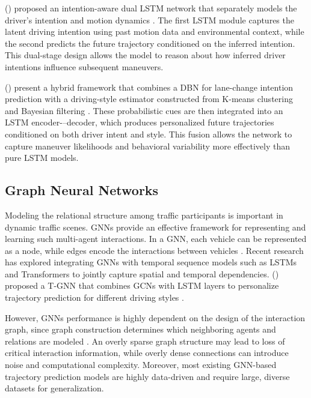 \par \citeauthor{xin2019intentionawarelonghorizontrajectory} (\citeyear{xin2019intentionawarelonghorizontrajectory}) proposed an intention-aware dual \ac{LSTM} network that separately models the
driver's intention and motion dynamics \cite{xin2019intentionawarelonghorizontrajectory}. The first \ac{LSTM} module captures the latent driving intention using
past motion data and environmental context, while the second predicts the future trajectory conditioned
on the inferred intention. This dual-stage design allows the model to reason about how inferred driver
intentions influence subsequent maneuvers.

\par \citeauthor{inproceedings} (\citeyear{inproceedings}) present a hybrid framework that combines a \ac{DBN} for
lane-change intention prediction with a driving-style estimator constructed from K-means clustering and
Bayesian filtering \cite{inproceedings}. These probabilistic cues are then integrated into an \ac{LSTM} encoder-–decoder, which
produces personalized future trajectories conditioned on both driver intent and style. This fusion allows
the network to capture maneuver likelihoods and behavioral variability more effectively than pure \ac{LSTM}
models.

\subsection{Graph Neural Networks}
Modeling the relational structure among traffic participants is important in dynamic traffic scenes. \acp{GNN}
provide an effective framework for representing and learning such multi-agent interactions. In a
\ac{GNN}, each vehicle can be represented as a node, while edges encode the interactions between 
vehicles \cite{diehl2019graphneuralnetworksmodelling}. Recent research has explored integrating \acp{GNN} with temporal sequence models such
as \acp{LSTM} and Transformers to jointly capture spatial and temporal dependencies. \citeauthor{abdelraouf2023} (\citeyear{abdelraouf2023}) 
proposed a \ac{T-GNN} that combines \acp{GCN} with \ac{LSTM} layers to personalize trajectory prediction for different driving styles \cite{abdelraouf2023}.

\par However, \acp{GNN} performance is highly dependent on the design of the interaction graph, since graph construction determines which neighboring agents and relations are
modeled \cite{diehl2019graphneuralnetworksmodelling}.
An overly sparse graph structure may lead to loss of critical interaction information, while overly dense
connections can introduce noise and computational complexity. Moreover, most existing \ac{GNN}-based
trajectory prediction models are highly data-driven and require large, diverse datasets for generalization.

